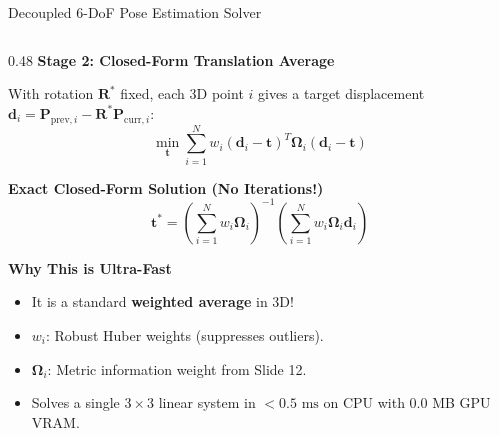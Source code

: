 \documentclass[aspectratio=169, 10pt]{beamer}
\begin{document}
\begin{frame}{Decoupled 6-DoF Pose Estimation Solver}
\begin{columns}[T]
    \begin{column}{0.48\textwidth}
      {\small \textbf{\textcolor{NavyBlue}{Stage 2: Closed-Form Translation Average}}}
      \vspace{0.06cm}

      \scriptsize
      With rotation $\mathbf{R}^*$ fixed, each 3D point $i$ gives a target displacement $\mathbf{d}_i = \mathbf{P}_{\text{prev}, i} - \mathbf{R}^* \mathbf{P}_{\text{curr}, i}$:
      \begin{equation}
        \min_{\mathbf{t}} \sum_{i=1}^N w_i (\mathbf{d}_i - \mathbf{t})^T \mathbf{\Omega}_i (\mathbf{d}_i - \mathbf{t})
      \end{equation}

      \vspace{-0.02cm}
      {\small \textbf{\textcolor{NavyBlue}{Exact Closed-Form Solution (No Iterations!)}}}
      \begin{equation}
        \boxed{\mathbf{t}^* = \left( \sum_{i=1}^N w_i \mathbf{\Omega}_i \right)^{-1} \left( \sum_{i=1}^N w_i \mathbf{\Omega}_i \mathbf{d}_i \right)}
      \end{equation}

      \vspace{-0.02cm}
      {\small \textbf{\textcolor{EmeraldGreen}{Why This is Ultra-Fast}}}\\
      \scriptsize
      \begin{itemize}
        \setlength{\itemsep}{1.5pt}
        \item It is a standard \textbf{weighted average} in 3D!
        \item $w_i$: Robust Huber weights (suppresses outliers).
        \item $\mathbf{\Omega}_i$: Metric information weight from Slide 12.
        \item Solves a single $3 \times 3$ linear system in $< 0.5\text{ ms}$ on CPU with 0.0 MB GPU VRAM.
      \end{itemize}
    \end{column}
  \end{columns}
\end{frame}
\end{document}
